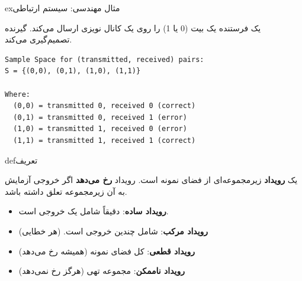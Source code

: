 \begin{PSbox}[unbreakable]{ex}{مثال مهندسی: سیستم ارتباطی}

یک فرستنده یک بیت (0 یا 1) را روی یک کانال نویزی ارسال می‌کند. گیرنده تصمیم‌گیری می‌کند.


\begin{PSplaincode}
\begin{Verbatim}
Sample Space for (transmitted, received) pairs:
S = {(0,0), (0,1), (1,0), (1,1)}

Where:
  (0,0) = transmitted 0, received 0 (correct)
  (0,1) = transmitted 0, received 1 (error)
  (1,0) = transmitted 1, received 0 (error)
  (1,1) = transmitted 1, received 1 (correct)
\end{Verbatim}
\end{PSplaincode}

\end{PSbox}


\begin{PSbox}[unbreakable]{def}{تعریف}

یک \textbf{رویداد} زیرمجموعه‌ای از فضای نمونه است. رویداد \textbf{رخ می‌دهد} اگر خروجی آزمایش به آن زیرمجموعه تعلق داشته باشد.

\end{PSbox}


\begin{itemize}
\tightlist
\item
  \textbf{رویداد ساده}: دقیقاً شامل یک خروجی است. 
\item
  \textbf{رویداد مرکب}: شامل چندین خروجی است.  (هر خطایی)
\item
  \textbf{رویداد قطعی}: کل فضای نمونه  (همیشه رخ می‌دهد)
\item
  \textbf{رویداد ناممکن}: مجموعه تهی \lr{\ensuremath{\emptyset}} (هرگز رخ نمی‌دهد)
\end{itemize}


